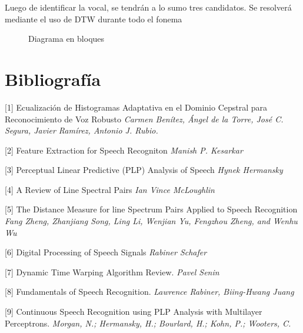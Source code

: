 \documentclass[a4paper]{article}
\begin{document}
		Luego de identificar la vocal, se tendrán a lo sumo
		tres candidatos.  Se resolverá mediante el uso de DTW
		durante todo el fonema

		\begin{figure}
			\fbox{
				
			}
			\caption{Diagrama en bloques}
		\end{figure}

	\section{Bibliografía}
		[1] Ecualización de Histogramas Adaptativa en
		el Dominio Cepstral para Reconocimiento de Voz Robusto
		\emph{Carmen Benítez, Ángel de la Torre, José C. Segura, Javier Ramírez, Antonio J. Rubio.}


		[2] Feature Extraction for Speech Recogniton
		\emph{Manish P. Kesarkar}


		[3] Perceptual Linear Predictive (PLP) Analysis of Speech
		\emph{Hynek Hermansky}


		[4] A Review of Line Spectral Pairs
		\emph{Ian Vince McLoughlin}


		[5] The Distance Measure for line Spectrum Pairs
		Applied to Speech Recognition
		\emph{Fang Zheng, Zhanjiang Song, Ling Li, Wenjian Yu, Fengzhou Zheng, and Wenhu Wu}


		[6] Digital Processing of Speech Signals
		\emph{Rabiner Schafer}


		[7] Dynamic Time Warping Algorithm Review. 
		\emph{Pavel Senin}


		[8] Fundamentals of Speech Recognition. 
		\emph{Lawrence Rabiner, Biing-Hwang Juang}

		[9] Continuous Speech Recognition using PLP Analysis with Multilayer Perceptrons. 
		\emph{Morgan, N.; Hermansky, H.; Bourlard, H.; Kohn, P.; Wooters, C.}
		
	
\end{document}
